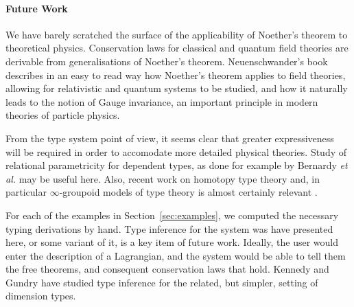 \documentclass[preprint]{sigplanconf}
\theoremstyle{examplestyle}
\begin{document}
\paragraph{Future Work} We have barely scratched the surface of the
applicability of Noether's theorem to theoretical
physics. Conservation laws for classical and quantum field theories
are derivable from generalisations of Noether's
theorem. Neuenschwander's book \cite{neuenschwander11} describes in an
easy to read way how Noether's theorem applies to field theories,
allowing for relativistic and quantum systems to be studied, and how
it naturally leads to the notion of Gauge invariance, an important
principle in modern theories of particle physics.

From the type system point of view, it seems clear that greater
expressiveness will be required in order to accomodate more detailed
physical theories. Study of relational parametricity for dependent
types, as done for example by Bernardy \emph{et al.}
\cite{bernardy12proofs} may be useful here. Also, recent work on
homotopy type theory and, in particular $\infty$-groupoid models of
type theory is almost certainly relevant \cite{hottbook2013}.

For each of the examples in Section~\ref{sec:examples}, we computed
the necessary typing derivations by hand. Type inference for the
system was have presented here, or some variant of it, is a key item
of future work. Ideally, the user would enter the description of a
Lagrangian, and the system would be able to tell them the free
theorems, and consequent conservation laws that hold. Kennedy
\cite{kennedy94} and Gundry \cite{gundry11} have studied type
inference for the related, but simpler, setting of dimension types.
\end{document}
